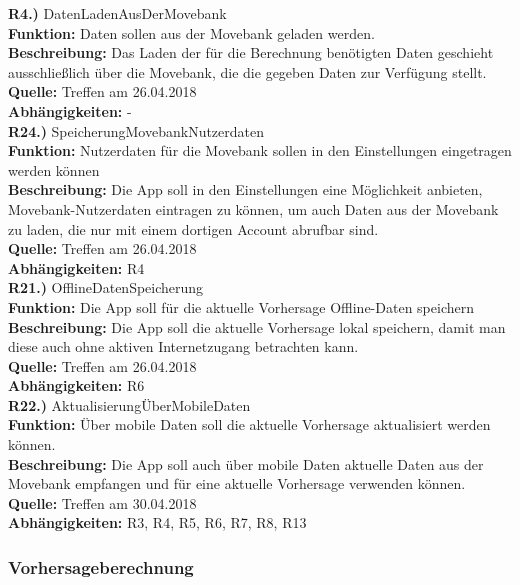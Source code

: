 \documentclass[12pt]{article} %
\begin{document}
\textbf{R4.)} DatenLadenAusDerMovebank \\
\textbf{Funktion:} Daten sollen aus der Movebank geladen werden. \\
\textbf{Beschreibung:} Das Laden der für die Berechnung benötigten Daten geschieht ausschließlich über die Movebank, die die gegeben Daten zur Verfügung stellt. \\
\textbf{Quelle:} Treffen am 26.04.2018 \\
\textbf{Abhängigkeiten:} - \\

\textbf{R24.)} SpeicherungMovebankNutzerdaten \\
\textbf{Funktion:} Nutzerdaten für die Movebank sollen in den Einstellungen eingetragen werden können \\
\textbf{Beschreibung:} Die App soll in den Einstellungen eine Möglichkeit anbieten, Movebank-Nutzerdaten eintragen zu können, um auch Daten aus der Movebank zu laden, die nur mit einem dortigen Account abrufbar sind. \\
\textbf{Quelle:} Treffen am 26.04.2018 \\
\textbf{Abhängigkeiten:} R4 \\

\textbf{R21.)} OfflineDatenSpeicherung \\
\textbf{Funktion:} Die App soll für die aktuelle Vorhersage Offline-Daten speichern \\
\textbf{Beschreibung:} Die App soll die aktuelle Vorhersage lokal speichern, damit man diese auch ohne aktiven Internetzugang betrachten kann. \\
\textbf{Quelle:} Treffen am 26.04.2018 \\
\textbf{Abhängigkeiten:} R6 \\

\textbf{R22.)} AktualisierungÜberMobileDaten \\
\textbf{Funktion:} Über mobile Daten soll die aktuelle Vorhersage aktualisiert werden können. \\
\textbf{Beschreibung:} Die App soll auch über mobile Daten aktuelle Daten aus der Movebank empfangen und für eine aktuelle Vorhersage verwenden können. \\
\textbf{Quelle:} Treffen am 30.04.2018 \\
\textbf{Abhängigkeiten:} R3, R4, R5, R6, R7, R8, R13 \\

\subsubsection{Vorhersageberechnung}
\end{document}
